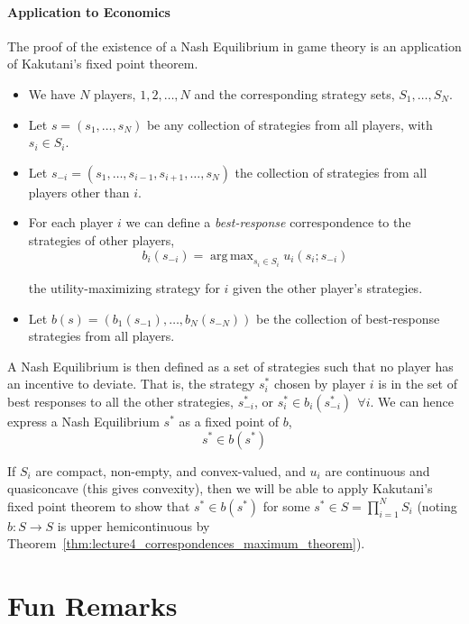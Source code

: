 \documentclass{article}
\DeclareMathOperator*{\argmax}{arg\,max}
\theoremstyle{mythm}
\theoremstyle{mydef}
\begin{document}
\paragraph{Application to Economics}
\label{par:application_to_economics_game_theory}

The proof of the existence of a Nash Equilibrium in game theory is an application of Kakutani's fixed point theorem.
\begin{itemize}
  \item We have $N$ players, $1, 2, \ldots, N$ and the corresponding strategy sets, $S_1, \ldots, S_N$.
  \item Let $s = (s_1, \ldots, s_N)$ be any collection of strategies from all players, with $s_i \in S_i$.
  \item Let $s_{-i} = (s_1, \ldots, s_{i - 1}, s_{i + 1}, \ldots, s_N)$ the collection of strategies from all players other than $i$.
  \item For each player $i$ we can define a \textit{best-response} correspondence to the strategies of other players,
    \[
      b_i(s_{-i}) = \argmax_{s_i \in S_i} u_i(s_i; s_{-i})
    \]

    the utility-maximizing strategy for $i$ given the other player's strategies.

  \item Let $b(s) = \left(b_1(s_{-1}), \ldots, b_N(s_{-N})\right)$ be the collection of best-response strategies from all players.
\end{itemize}

A Nash Equilibrium is then defined as a set of strategies such that no player has an incentive to deviate. That is, the strategy $s^*_i$ chosen by player $i$ is in the set of best responses to all the other strategies, $s^*_{-i}$, or $s^*_i \in b_i(s^*_{-i}) ~~ \forall i$. We can hence express a Nash Equilibrium $s^*$ as a fixed point of $b$,
\[
  s^* \in b(s^*)
\]

If $S_i$ are compact, non-empty, and convex-valued, and $u_i$ are continuous and quasiconcave (this gives convexity), then we will be able to apply Kakutani's fixed point theorem to show that $s^* \in b(s^*)$ for some $s^* \in S = \prod_{i = 1}^N S_i$ (noting $b: S \to S$ is upper hemicontinuous by Theorem~\ref{thm:lecture4_correspondences_maximum_theorem}).

\section{Fun Remarks}
\label{sub:fun_remarks}
\end{document}
